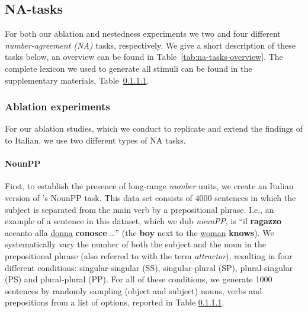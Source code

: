 \subsection{NA-tasks}

For both our ablation and nestedness experiments  we two and four different \emph{number-agreement (NA)} tasks, respectively.
We give a short description of these tasks below, an overview can be found in Table~\ref{tab:na-tasks-overview}.
The complete lexicon we used to generate all stimuli can be found in the supplementary materials, Table~\ref{}.

\subsubsection{Ablation experiments}
For our ablation studies, which we conduct to replicate and extend the findings of \citet{lakretz2019emergence} to Italian, we use two different types of NA tasks.

\paragraph{NounPP}
First, to establish the presence of long-range \emph{number} units, we create an Italian version of \citeauthor{lakretz2019emergence}'s \citeyear{lakretz2019emergence} NounPP task.
This data set consists of 4000 sentences in which the subject is separated from the main verb by a prepositional phrase.
I.e., an example of a sentence in this dataset, which we dub \emph{nounPP}, is ``il \textbf{ragazzo} accanto alla \underline{donna} \textbf{conosce} \ldots'' (the \textbf{boy} next to the \underline{woman} \textbf{knows}).
We systematically vary the number of both the subject and the noun in the prepositional phrase (also referred to with the term \emph{attractor}), resulting in four different conditions: singular-singular (SS), singular-plural (SP), plural-singular (PS) and plural-plural (PP).
For all of these conditions, we generate 1000 sentences by randomly sampling (object and subject) nouns, verbs and prepositions from a list of options, reported in Table \ref{}.

